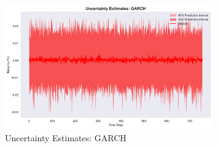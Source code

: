 \begin{figure}[htbp]
\centering
\includegraphics[width=0.8\textwidth]{figures/uncertainty_garch.pdf}
\caption{Uncertainty Estimates: GARCH}
\label{fig:uncertaintygarch}
\end{figure}